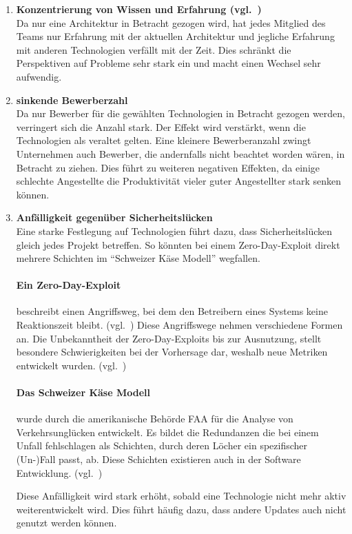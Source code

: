 \documentclass[./einleitung.tex]{subfiles}
\begin{document}
\begin{enumerate}
\item \textbf{Konzentrierung von Wissen und Erfahrung (vgl.~\cite{cury2024knowledge})} \\
Da nur eine Architektur in Betracht gezogen wird, hat jedes Mitglied des Teams nur Erfahrung mit der aktuellen Architektur und jegliche Erfahrung mit anderen Technologien verfällt mit der Zeit.
Dies schränkt die Perspektiven auf Probleme sehr stark ein und macht einen Wechsel sehr aufwendig.
\item \textbf{sinkende Bewerberzahl} \\
Da nur Bewerber für die gewählten Technologien in Betracht gezogen werden, verringert sich die Anzahl stark.
Der Effekt wird verstärkt, wenn die Technologien als veraltet gelten.
Eine kleinere Bewerberanzahl zwingt Unternehmen auch Bewerber, die andernfalls nicht beachtet worden wären, in Betracht zu ziehen.
Dies führt zu weiteren negativen Effekten, da einige schlechte Angestellte die Produktivität vieler guter Angestellter stark senken können.
\item \textbf{Anfälligkeit gegenüber Sicherheitslücken} \\
Eine starke Festlegung auf Technologien führt dazu, dass Sicherheitslücken gleich jedes Projekt betreffen.
So könnten bei einem Zero-Day-Exploit direkt mehrere Schichten im ``Schweizer Käse Modell'' wegfallen.
\begin{center}
    \paragraph{Ein Zero-Day-Exploit} beschreibt einen Angriffsweg, bei dem den Betreibern eines Systems keine Reaktionszeit bleibt. (vgl.~\cite{ibmZeroDay})
    Diese Angriffswege nehmen verschiedene Formen an.
    Die Unbekanntheit der Zero-Day-Exploits bis zur Ausnutzung, stellt besondere Schwierigkeiten bei der Vorhersage dar, weshalb neue Metriken entwickelt wurden. (vgl.~\cite{wang2013k})
\end{center}
\begin{center}
    \paragraph{Das Schweizer Käse Modell} wurde durch die amerikanische Behörde FAA für die Analyse von Verkehrsunglücken entwickelt.
    Es bildet die Redundanzen die bei einem Unfall fehlschlagen als Schichten, durch deren Löcher ein spezifischer (Un-)Fall passt, ab.
    Diese Schichten existieren auch in der Software Entwicklung. (vgl.~\cite{bergeon2009swiss}) %
\end{center}
Diese Anfälligkeit wird stark erhöht, sobald eine Technologie nicht mehr aktiv weiterentwickelt wird.
Dies führt häufig dazu, dass andere Updates auch nicht genutzt werden können.
\end{enumerate}
\end{document}
